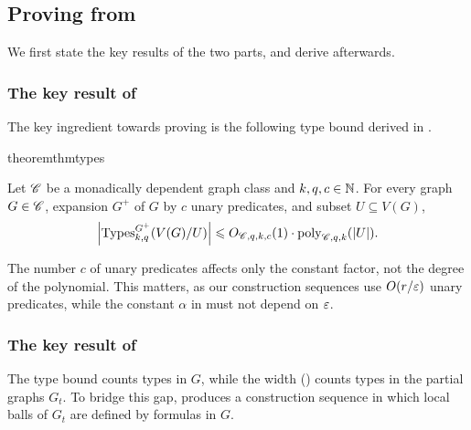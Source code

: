 \subsection{Proving \texorpdfstring{ from }{Theorem  from Parts I and II}}\label{sec:skel-few-types}

We first state the key results of the two parts, and derive  afterwards.

\subsubsection{The key result of \texorpdfstring{}{Part I}}\label{sec:skel-part-types}

The key ingredient towards proving  is the following type bound derived in .

\newif\iftypeboundgeneral
\begin{restatable}{theorem}{thmtypes}\label{thm:type-bound}

Let $\mathscr C$ be a monadically dependent graph class and $k,q,c\in\mathbb N$.
For every \iftypeboundgeneral(possibly infinite) \fi graph $G \in \mathscr C$, expansion $G^+$ of $G$ by $c$ unary predicates, and \iftypeboundgeneral finite \fi subset $U \subseteq V(G)$,
\[
    \left|\operatorname{Types}^{G^+}_{k,q}(V(G)/U)\right| \leqslant O_{\mathscr C,q,k,c}(1)\cdot \mathrm{poly}_{\mathscr C,q,k}(|U|).
\]

\end{restatable}

The number $c$ of unary predicates affects only the constant factor, not the degree of the polynomial.
This matters, as our construction sequences use $O(r/\varepsilon)$ unary predicates, while the constant $\alpha$ in  must not depend on $\varepsilon$.

\subsubsection{The key result of \texorpdfstring{}{Part II}}\label{sec:skel-part-defseq}

The type bound counts types in $G$, while the width () counts types in the partial graphs $G_t$.
To bridge this gap,  produces a construction sequence in which local balls of $G_t$ are defined by formulas in $G$.

